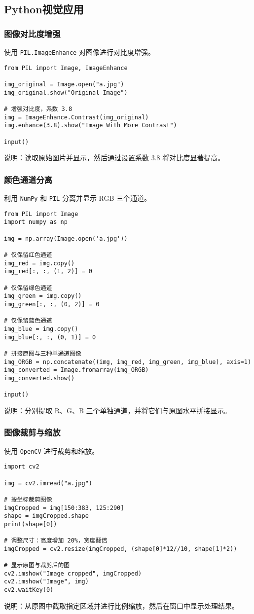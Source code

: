 \documentclass[a4paper,12pt]{ctexart}
\begin{document}
\subsection{Python视觉应用}

\subsubsection{图像对比度增强}
使用 \texttt{PIL.ImageEnhance} 对图像进行对比度增强。
\begin{lstlisting}
from PIL import Image, ImageEnhance

img_original = Image.open("a.jpg")
img_original.show("Original Image")

# 增强对比度，系数 3.8
img = ImageEnhance.Contrast(img_original)
img.enhance(3.8).show("Image With More Contrast")

input()
\end{lstlisting}
说明：读取原始图片并显示，然后通过设置系数 3.8 将对比度显著提高。

\subsubsection{颜色通道分离}
利用 \texttt{NumPy} 和 \texttt{PIL} 分离并显示 RGB 三个通道。
\begin{lstlisting}
from PIL import Image
import numpy as np

img = np.array(Image.open('a.jpg'))

# 仅保留红色通道
img_red = img.copy()
img_red[:, :, (1, 2)] = 0

# 仅保留绿色通道
img_green = img.copy()
img_green[:, :, (0, 2)] = 0

# 仅保留蓝色通道
img_blue = img.copy()
img_blue[:, :, (0, 1)] = 0

# 拼接原图与三种单通道图像
img_ORGB = np.concatenate((img, img_red, img_green, img_blue), axis=1)
img_converted = Image.fromarray(img_ORGB)
img_converted.show()

input()
\end{lstlisting}
说明：分别提取 R、G、B 三个单独通道，并将它们与原图水平拼接显示。

\subsubsection{图像裁剪与缩放}
使用 \texttt{OpenCV} 进行裁剪和缩放。
\begin{lstlisting}
import cv2

img = cv2.imread("a.jpg")

# 按坐标裁剪图像
imgCropped = img[150:383, 125:290]
shape = imgCropped.shape
print(shape[0])

# 调整尺寸：高度增加 20%，宽度翻倍
imgCropped = cv2.resize(imgCropped, (shape[0]*12//10, shape[1]*2))

# 显示原图与裁剪后的图
cv2.imshow("Image cropped", imgCropped)
cv2.imshow("Image", img)
cv2.waitKey(0)
\end{lstlisting}
说明：从原图中截取指定区域并进行比例缩放，然后在窗口中显示处理结果。
\end{document}
